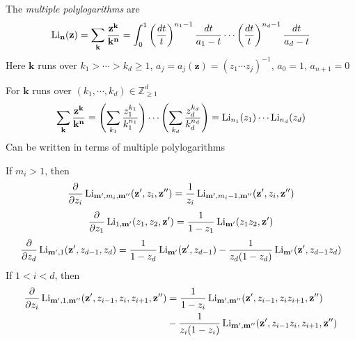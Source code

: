 \documentclass[main]{subfiles}
\begin{document}
\begin{definition}
The \textit{multiple polylogarithms} are
\[\operatorname{Li}_{\mathbf n}(\mathbf z)=\sum_{\mathbf k}\frac{\mathbf z^{\mathbf k}}{\mathbf k^{\mathbf n}}=\int_0^1\left(\frac{dt}{t}\right)^{n_1-1}\frac{dt}{a_1-t}\cdots\left(\frac{dt}{t}\right)^{n_d-1}\frac{dt}{a_d-t}\]
Here $\mathbf k$ runs over $k_1>\cdots>k_d\geq1$, $a_j=a_j(\mathbf z)=(z_1\cdots z_j)^{-1}$, $a_0=1$, $a_{n+1}=0$
\end{definition}

\begin{note}
For $\mathbf k$ runs over $(k_1,\cdots,k_d)\in\mathbb Z_{\geq1}^d$
\[\sum_{\mathbf k}\frac{\mathbf z^{\mathbf k}}{\mathbf k^{\mathbf n}}=\left(\sum_{k_1}\frac{z_1^{k_1}}{k_1^{n_1}}\right)\cdots\left(\sum_{k_d}\frac{z_d^{k_d}}{k_d^{n_d}}\right)=\operatorname{Li}_{n_1}(z_1)\cdots\operatorname{Li}_{n_d}(z_d)\]
Can be written in terms of multiple polylogarithms
\end{note}

\begin{exercise}
If $m_i>1$, then
\begin{align*}
\dfrac{\partial}{\partial z_i}\operatorname{Li}_{\mathbf m', m_i,\mathbf m''}(\mathbf z',z_i,\mathbf z'')=\dfrac{1}{z_i}\operatorname{Li}_{\mathbf m',m_i-1,\mathbf m''}(\mathbf z',z_i,\mathbf z'')
\end{align*}
\begin{align*}
\dfrac{\partial}{\partial z_1}\operatorname{Li}_{1,\mathbf m'}(z_1,z_2,\mathbf z')=\frac{1}{1-z_1}\operatorname{Li}_{\mathbf m'}(z_1z_2,\mathbf z')
\end{align*}
\begin{align*}
\dfrac{\partial}{\partial z_d}\operatorname{Li}_{\mathbf m',1}(\mathbf z',z_{d-1},z_d)=\frac{1}{1-z_d}\operatorname{Li}_{\mathbf m'}(\mathbf z',z_{d-1})-\frac{1}{z_d(1-z_d)}\operatorname{Li}_{\mathbf m'}(\mathbf z',z_{d-1}z_d)
\end{align*}
If $1<i<d$, then
\begin{align*}
\dfrac{\partial}{\partial z_i}\operatorname{Li}_{\mathbf m',1,\mathbf m''}(\mathbf z',z_{i-1},z_i,z_{i+1},\mathbf z'')&=\frac{1}{1-z_i}\operatorname{Li}_{\mathbf m',\mathbf m''}(\mathbf z',z_{i-1},z_iz_{i+1},\mathbf z'') \\
&-\frac{1}{z_i(1-z_i)}\operatorname{Li}_{\mathbf m',\mathbf m''}(\mathbf z',z_{i-1}z_i,z_{i+1},\mathbf z'')
\end{align*}
\end{exercise}
\end{document}
